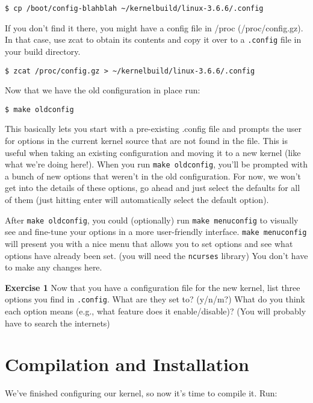 \documentclass{article}
\begin{document}
\begin{verbatim}$ cp /boot/config-blahblah ~/kernelbuild/linux-3.6.6/.config\end{verbatim}

If you don't find it there, you might have a config file in /proc (/proc/config.gz). In that case, use zcat to obtain its contents and copy it over to a \texttt{.config} file in your build directory.

\begin{verbatim}$ zcat /proc/config.gz > ~/kernelbuild/linux-3.6.6/.config\end{verbatim}

Now that we have the old configuration in place run: 

\begin{verbatim}$ make oldconfig\end{verbatim}

This basically lets you start with a pre-existing .config file and prompts the user for options in the current kernel source that are not found in the file. This is useful when taking an existing configuration and moving it to a new kernel (like what we're doing here!). 
When you run \texttt{make oldconfig}, you'll be prompted with a bunch of new options that weren't in the old configuration. For now, we won't get into the details of these options, go ahead and just select the defaults for all of them (just hitting enter will automatically select the default option).

After \texttt{make oldconfig}, you could (optionally) run \texttt{make menuconfig} to visually see and fine-tune your options in a more user-friendly interface. \texttt{make menuconfig} will present you with a nice menu that allows you to set options and see what options have already been set. (you will need the \texttt{ncurses} library) You don't have to make any changes here.


{\bf Exercise 1} Now that you have a configuration file for the new kernel, list three options you find in \texttt{.config}. What are they set to? (y/n/m?) What do you think each option means (e.g., what feature does it enable/disable)? (You will probably have to search the internets) 


\section{Compilation and Installation} 

We've finished configuring our kernel, so now it's time to compile it. Run:
\end{document}
